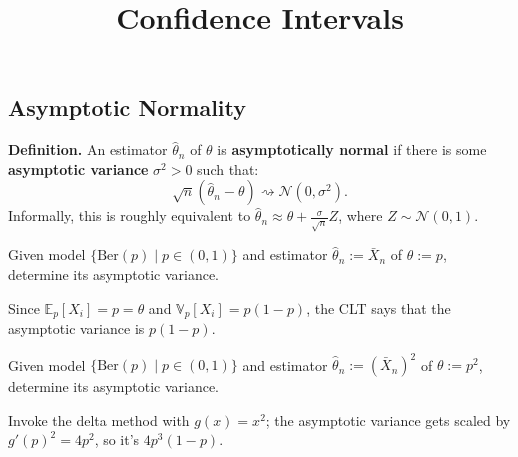 \title{Confidence Intervals}



\subsection{Asymptotic Normality}

\textbf{Definition.} An estimator $\hat{\theta}_n$ of $\theta$ is \textbf{asymptotically normal}
if there is some \textbf{asymptotic variance} $\sigma^2 > 0$ such that:
\[ \sqrt{n}(\hat{\theta}_n - \theta) \rightsquigarrow \mathcal{N}(0, \sigma^2). \]
Informally, this is roughly equivalent to
$\hat{\theta}_n \approx \theta + \frac{\sigma}{\sqrt{n}}Z$, where $Z \sim \mathcal{N}(0, 1)$.

\begin{problem}
    Given model $\{\mathrm{Ber}(p) \mid p \in (0, 1)\}$
    and estimator $\hat{\theta}_n := \bar{X}_n$ of $\theta := p$,
    determine its asymptotic variance.
\end{problem}

\begin{solution}
    Since $\mathbb{E}_p[X_i] = p = \theta$ and
    $\mathbb{V}_p[X_i] = p(1 - p)$, the CLT says that
    the asymptotic variance is $p(1 - p)$.
\end{solution}

\begin{problem}
    Given model $\{\mathrm{Ber}(p) \mid p \in (0, 1)\}$
    and estimator $\hat{\theta}_n := (\bar{X}_n)^2$ of $\theta := p^2$,
    determine its asymptotic variance.
\end{problem}

\begin{solution}
    Invoke the delta method with $g(x) = x^2$;
    the asymptotic variance gets scaled by
    $g'(p)^2 = 4p^2$, so it's $4p^3(1 - p)$.
\end{solution}

